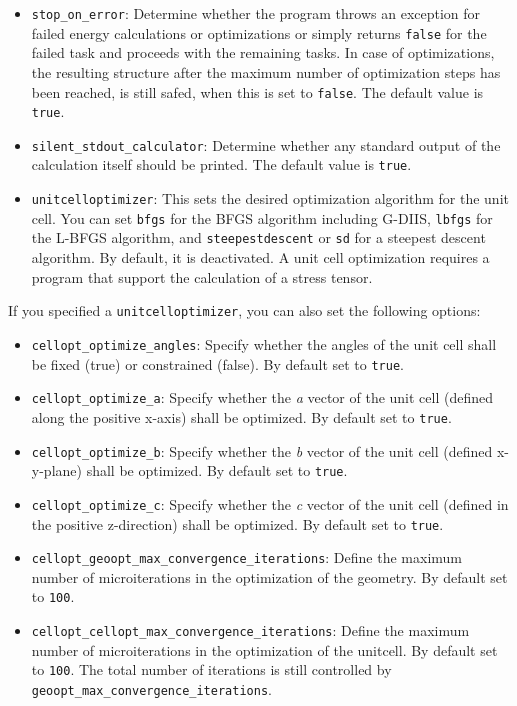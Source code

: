 \documentclass[]{tufte-book}
\begin{document}
\begin{itemize}
\item \texttt{stop\_on\_error}: Determine whether the program throws an exception for failed energy calculations or optimizations or simply returns \texttt{false} for the failed task and proceeds with the remaining tasks. In case of optimizations, the resulting structure after the maximum number of optimization steps has been reached, is still safed, when this is set to \texttt{false}. The default value is \texttt{true}.
\item \texttt{silent\_stdout\_calculator}: Determine whether any standard output of the calculation itself should be printed. The default value is \texttt{true}.
\item \texttt{unitcelloptimizer}: This sets the desired optimization algorithm for the unit cell. You can set \texttt{bfgs} 
for the BFGS algorithm including G-DIIS, \texttt{lbfgs} for the L-BFGS algorithm, and \texttt{steepestdescent} or \texttt{sd}
for a steepest descent algorithm. By default, it is deactivated. A unit cell optimization requires a program that support the calculation
of a stress tensor.
\end{itemize}
If you specified a \texttt{unitcelloptimizer}, you can also set the following options:
\begin{itemize}
\item \texttt{cellopt\_optimize\_angles}: Specify whether the angles of the unit cell shall be fixed (true) or constrained (false). By default set to \texttt{true}.
\item \texttt{cellopt\_optimize\_a}: Specify whether the \textit{a} vector of the unit cell (defined along the positive x-axis) shall be optimized. By default set to \texttt{true}.
\item \texttt{cellopt\_optimize\_b}: Specify whether the \textit{b} vector of the unit cell (defined x-y-plane) shall be optimized. By default set to \texttt{true}.
\item \texttt{cellopt\_optimize\_c}: Specify whether the \textit{c} vector of the unit cell (defined in the positive z-direction) shall be optimized. By default set to \texttt{true}.
\item \texttt{cellopt\_geoopt\_max\_convergence\_iterations}: Define the maximum number of microiterations in the optimization of the geometry. By default set to \texttt{100}.
\item \texttt{cellopt\_cellopt\_max\_convergence\_iterations}: Define the maximum number of microiterations in the optimization of the unitcell. By default set to \texttt{100}.
The total number of iterations is still controlled by \texttt{geoopt\_max\_convergence\_iterations}.
\end{itemize}
\end{document}
